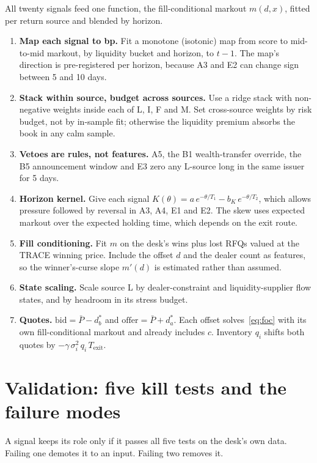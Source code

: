 \documentclass[11pt,letterpaper]{article}
\newcommand{\Pm}{\bar{P}}                 %
\begin{document}
All twenty signals feed one function, the fill-conditional markout $m(d,x)$, fitted per return source and blended by horizon.
\begin{enumerate}[itemsep=3pt]
\item \textbf{Map each signal to bp.} Fit a monotone (isotonic) map from score to mid-to-mid markout, by liquidity bucket and horizon, to $t-1$. The map's direction is pre-registered per horizon, because A3 and E2 can change sign between 5 and 10 days.
\item \textbf{Stack within source, budget across sources.} Use a ridge stack with non-negative weights inside each of L, I, F and M. Set cross-source weights by risk budget, not by in-sample fit; otherwise the liquidity premium absorbs the book in any calm sample.
\item \textbf{Vetoes are rules, not features.} A5, the B1 wealth-transfer override, the B5 announcement window and E3 zero any L-source long in the same issuer for 5 days.
\item \textbf{Horizon kernel.} Give each signal $K(\theta)=a\,e^{-\theta/T_1}-b_K\,e^{-\theta/T_2}$, which allows pressure followed by reversal in A3, A4, E1 and E2. The skew uses expected markout over the expected holding time, which depends on the exit route.
\item \textbf{Fill conditioning.} Fit $m$ on the desk's wins plus lost RFQs valued at the TRACE winning price. Include the offset $d$ and the dealer count as features, so the winner's-curse slope $m'(d)$ is estimated rather than assumed.
\item \textbf{State scaling.} Scale source L by dealer-constraint and liquidity-supplier flow states, and by headroom in its stress budget.
\item \textbf{Quotes.} $\mathrm{bid}=\Pm-d^{*}_{b}$ and $\mathrm{offer}=\Pm+d^{*}_{a}$. Each offset solves~\eqref{eq:foc} with its own fill-conditional markout and already includes $c$. Inventory $q_i$ shifts both quotes by $-\gamma\,\sigma_i^2\,q_i\,T_{\mathrm{exit}}$.
\end{enumerate}

\section{Validation: five kill tests and the failure modes}
\label{sec:validation}

A signal keeps its role only if it passes all five tests on the desk's own data. Failing one demotes it to an input. Failing two removes it.
\end{document}
